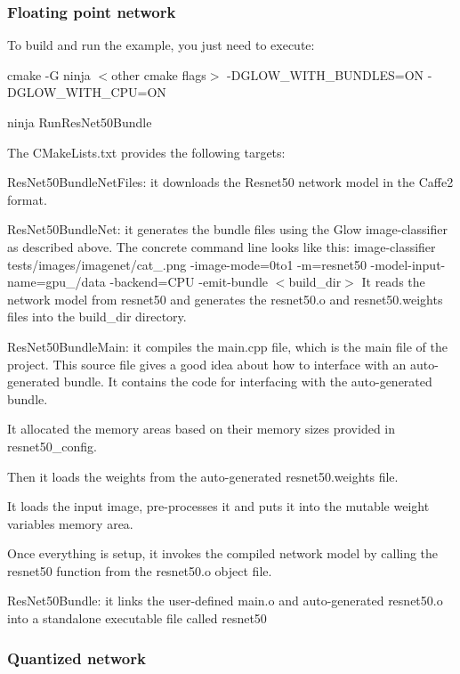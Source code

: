 \subsubsection*{Floating point network}

To build and run the example, you just need to execute\+:
\begin{DoxyItemize}
\item {\ttfamily cmake -\/G ninja $<$other cmake flags$>$ -\/\+D\+G\+L\+O\+W\+\_\+\+W\+I\+T\+H\+\_\+\+B\+U\+N\+D\+L\+ES=ON -\/\+D\+G\+L\+O\+W\+\_\+\+W\+I\+T\+H\+\_\+\+C\+PU=ON}
\item {\ttfamily ninja Run\+Res\+Net50\+Bundle}
\end{DoxyItemize}

The C\+Make\+Lists.\+txt provides the following targets\+:
\begin{DoxyItemize}
\item {\ttfamily Res\+Net50\+Bundle\+Net\+Files}\+: it downloads the Resnet50 network model in the Caffe2 format.
\item {\ttfamily Res\+Net50\+Bundle\+Net}\+: it generates the bundle files using the Glow image-\/classifier as described above. The concrete command line looks like this\+: {\ttfamily image-\/classifier tests/images/imagenet/cat\+\_.\+png -\/image-\/mode=0to1 -\/m=resnet50 -\/model-\/input-\/name=gpu\+\_/data -\/backend=C\+PU -\/emit-\/bundle $<$build\+\_\+dir$>$} It reads the network model from {\ttfamily resnet50} and generates the {\ttfamily resnet50.\+o} and {\ttfamily resnet50.\+weights} files into the {\ttfamily build\+\_\+dir} directory.
\item {\ttfamily Res\+Net50\+Bundle\+Main}\+: it compiles the {\ttfamily main.\+cpp} file, which is the main file of the project. This source file gives a good idea about how to interface with an auto-\/generated bundle. It contains the code for interfacing with the auto-\/generated bundle.
\begin{DoxyItemize}
\item It allocated the memory areas based on their memory sizes provided in {\ttfamily resnet50\+\_\+config}.
\item Then it loads the weights from the auto-\/generated {\ttfamily resnet50.\+weights} file.
\item It loads the input image, pre-\/processes it and puts it into the mutable weight variables memory area.
\item Once everything is setup, it invokes the compiled network model by calling the {\ttfamily resnet50} function from the {\ttfamily resnet50.\+o} object file.
\end{DoxyItemize}
\item {\ttfamily Res\+Net50\+Bundle}\+: it links the user-\/defined {\ttfamily main.\+o} and auto-\/generated {\ttfamily resnet50.\+o} into a standalone executable file called {\ttfamily resnet50} \subsubsection*{Quantized network}
\end{DoxyItemize}

